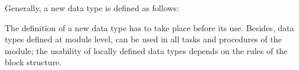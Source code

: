 Generally, a new data type is defined as follows:



The definition of a new data type has to take place before its use.
Besides, data types defined at module level, can be used in all tasks
and procedures of the module; the usability of locally defined data
types depends on the rules of the block structure.

